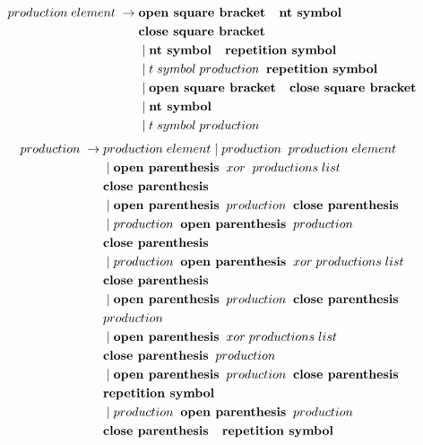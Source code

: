  

\begin{align*}
	production\;element\; \rightarrow\; & \textbf{open square bracket \; nt symbol} \\ 
			   &\textbf{close square bracket}\\
               &\mid \textbf{nt symbol \; repetition symbol} \\
               &\mid t\;symbol\;production\;\; \textbf{repetition symbol} \\
               &\mid \textbf{open square bracket \; close square bracket} \\
               &\mid \textbf{nt symbol} \\
               &\mid t\; symbol\; production 
\end{align*}
\begin{align*}
	production\; \rightarrow\; &production\; element
                \mid production\;\; production\; element \\
               &\mid \textbf{open parenthesis}\;\; xor\; \;productions\; list\;\; \\
               &\textbf{close parenthesis} \\
               &\mid \textbf{open parenthesis}\;\; production\;\; \textbf{close parenthesis} \\
               &\mid production \;\;\textbf{open parenthesis}\;\; production \\
               &\textbf{close parenthesis} \\
               &\mid production\;\; \textbf{open parenthesis} \;\;xor \;productions\; list\\
               &\textbf{close parenthesis} \\
               &\mid \textbf{open parenthesis} \;\;production \;\;\textbf{close parenthesis} \\
               &production \\
               &\mid \textbf{open parenthesis}\;\; xor\; productions\; list\\ 
               &\textbf{close parenthesis}\;\; production \\
               &\mid \textbf{open parenthesis}\;\; production\;\; \textbf{close parenthesis} \\
               &\textbf{repetition symbol}\\
               &\mid production\;\; \textbf{open parenthesis} \;\;production \\
               &\textbf{close parenthesis \; repetition symbol}
\end{align*}


